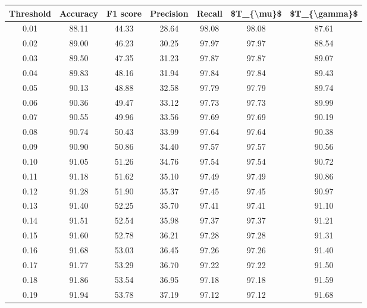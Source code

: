 \begin{tabular}{|c|c|c|c|c|c|c|}
\hline
 Threshold &  Accuracy &  F1 score &  Precision &  Recall &  \$T\_\{\textbackslash mu\}\$ &  \$T\_\{\textbackslash gamma\}\$ \\
\hline
      0.01 &     88.11 &     44.33 &      28.64 &   98.08 &      98.08 &         87.61 \\
      0.02 &     89.00 &     46.23 &      30.25 &   97.97 &      97.97 &         88.54 \\
      0.03 &     89.50 &     47.35 &      31.23 &   97.87 &      97.87 &         89.07 \\
      0.04 &     89.83 &     48.16 &      31.94 &   97.84 &      97.84 &         89.43 \\
      0.05 &     90.13 &     48.88 &      32.58 &   97.79 &      97.79 &         89.74 \\
      0.06 &     90.36 &     49.47 &      33.12 &   97.73 &      97.73 &         89.99 \\
      0.07 &     90.55 &     49.96 &      33.56 &   97.69 &      97.69 &         90.19 \\
      0.08 &     90.74 &     50.43 &      33.99 &   97.64 &      97.64 &         90.38 \\
      0.09 &     90.90 &     50.86 &      34.40 &   97.57 &      97.57 &         90.56 \\
      0.10 &     91.05 &     51.26 &      34.76 &   97.54 &      97.54 &         90.72 \\
      0.11 &     91.18 &     51.62 &      35.10 &   97.49 &      97.49 &         90.86 \\
      0.12 &     91.28 &     51.90 &      35.37 &   97.45 &      97.45 &         90.97 \\
      0.13 &     91.40 &     52.25 &      35.70 &   97.41 &      97.41 &         91.10 \\
      0.14 &     91.51 &     52.54 &      35.98 &   97.37 &      97.37 &         91.21 \\
      0.15 &     91.60 &     52.78 &      36.21 &   97.28 &      97.28 &         91.31 \\
      0.16 &     91.68 &     53.03 &      36.45 &   97.26 &      97.26 &         91.40 \\
      0.17 &     91.77 &     53.29 &      36.70 &   97.22 &      97.22 &         91.50 \\
      0.18 &     91.86 &     53.54 &      36.95 &   97.18 &      97.18 &         91.59 \\
      0.19 &     91.94 &     53.78 &      37.19 &   97.12 &      97.12 &         91.68 \\

\end{tabular}
